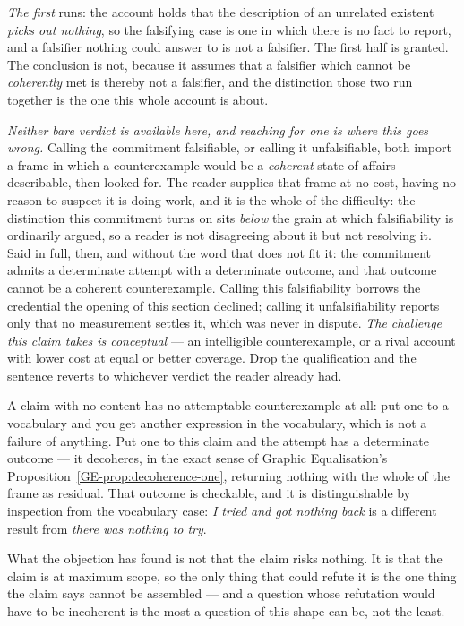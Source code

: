 \documentclass[11pt,a4paper]{article}
\begin{document}
\emph{The first} runs: the account holds that the description of an unrelated existent \emph{picks out
nothing}, so the falsifying case is one in which there is no fact to report, and a falsifier nothing
could answer to is not a falsifier. The first half is granted. The conclusion is not, because it assumes
that a falsifier which cannot be \emph{coherently} met is thereby not a falsifier, and the distinction
those two run together is the one this whole account is about.

\emph{Neither bare verdict is available here, and reaching for one is where this goes wrong.} Calling
the commitment falsifiable, or calling it unfalsifiable, both import a frame in which a counterexample
would be a \emph{coherent} state of affairs --- describable, then looked for. The reader supplies that
frame at no cost, having no reason to suspect it is doing work, and it is the whole of the difficulty:
the distinction this commitment turns on sits \emph{below} the grain at which falsifiability is
ordinarily argued, so a reader is not disagreeing about it but not resolving it. Said in full, then, and without the word that does not fit
it: the commitment admits a determinate attempt with a determinate outcome, and that outcome cannot be
a coherent counterexample. Calling this falsifiability borrows the credential the opening of this
section declined; calling it unfalsifiability reports only that no measurement settles it, which was
never in dispute. \emph{The challenge this claim takes is conceptual} --- an intelligible
counterexample, or a rival account with lower cost at equal or better coverage. Drop the qualification
and the sentence reverts to whichever verdict the reader already had.

A claim with no content has no attemptable counterexample at all:
put one to a vocabulary and you get another expression in the vocabulary, which is not a failure of
anything. Put one to this claim and the attempt has a determinate outcome --- it decoheres, in the exact
sense of Graphic Equalisation's Proposition~\ref{GE-prop:decoherence-one}, returning nothing with the
whole of the frame as residual. That outcome is
checkable, and it is distinguishable by inspection from the vocabulary case: \emph{I tried and got
nothing back} is a different result from \emph{there was nothing to try}.

What the objection has found
is not that the claim risks nothing. It is that the claim is at maximum scope, so the only thing that
could refute it is the one thing the claim says cannot be assembled --- and a question whose refutation
would have to be incoherent is the most a question of this shape can be, not the least.
\end{document}
